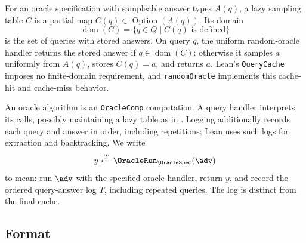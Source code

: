 \begin{definition}
\label{def:lazy_sampling_table}
\leanok
For an oracle specification with sampleable answer types \(A(q)\), a lazy sampling
table \(C\) is a partial map \(C(q)\in\operatorname{Option}(A(q))\). Its domain
\begin{equation*}
\operatorname{dom}(C)=\{q\in Q\mid C(q)\text{ is defined}\}
\end{equation*}
is the set of queries with stored answers. On query \(q\), the uniform random-oracle
handler returns the stored answer if \(q\in\operatorname{dom}(C)\); otherwise it
samples \(a\) uniformly from \(A(q)\), stores \(C(q)=a\), and returns \(a\).
Lean's \texttt{QueryCache} imposes no finite-domain requirement, and
\texttt{randomOracle} implements this cache-hit and cache-miss behavior.
\end{definition}

\begin{definition}
\label{def:oracle_run}
\leanok
An oracle algorithm is an \texttt{OracleComp} computation. A query handler
interprets its calls, possibly maintaining a lazy table as in
. Logging additionally records each query and answer
in order, including repetitions; Lean uses such logs for extraction and backtracking. We
write
\begin{equation*}
y\xleftarrow{T}\OracleRun_{\OracleSpec}(\adv)
\end{equation*}
to mean: run \(\adv\) with the specified oracle handler, return \(y\), and
record the ordered query-answer log \(T\), including repeated queries.
The log is distinct from the final cache.
\end{definition}

\subsection{Format}\label{sec:oracle_reductions_defs_format}

